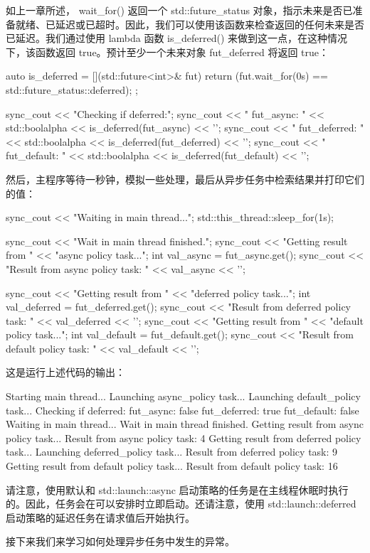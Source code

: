 如上一章所述， wait\_for() 返回一个 std::future\_status 对象，指示未来是否已准备就绪、已延迟或已超时。因此，我们可以使用该函数来检查返回的任何未来是否已延迟。我们通过使用 lambda 函数 is\_deferred() 来做到这一点，在这种情况下，该函数返回 true。预计至少一个未来对象 fut\_deferred 将返回 true：

\begin{cpp}
auto is_deferred = [](std::future<int>& fut) {
    return (fut.wait_for(0s) ==
    std::future_status::deferred);
};

sync_cout << "Checking if deferred:\n";
sync_cout << " fut_async: " << std::boolalpha
          << is_deferred(fut_async) << '\n';
sync_cout << " fut_deferred: " << std::boolalpha
          << is_deferred(fut_deferred) << '\n';
sync_cout << " fut_default: " << std::boolalpha
          << is_deferred(fut_default) << '\n';
\end{cpp}

然后，主程序等待一秒钟，模拟一些处理，最后从异步任务中检索结果并打印它们的值：

\begin{cpp}
sync_cout << "Waiting in main thread...\n";
std::this_thread::sleep_for(1s);

sync_cout << "Wait in main thread finished.\n";
sync_cout << "Getting result from "
          << "async policy task...\n";
int val_async = fut_async.get();
sync_cout << "Result from async policy task: "
          << val_async << '\n';

sync_cout << "Getting result from "
          << "deferred policy task...\n";
int val_deferred = fut_deferred.get();
sync_cout << "Result from deferred policy task: "
          << val_deferred << '\n';
sync_cout << "Getting result from "
          << "default policy task...\n";
int val_default = fut_default.get();
sync_cout << "Result from default policy task: "
          << val_default << '\n';
\end{cpp}

这是运行上述代码的输出：

\begin{shell}
Starting main thread...
Launching async_policy task...
Launching default_policy task...
Checking if deferred:
  fut_async: false
  fut_deferred: true
  fut_default: false
Waiting in main thread...
Wait in main thread finished.
Getting result from async policy task...
Result from async policy task: 4
Getting result from deferred policy task...
Launching deferred_policy task...
Result from deferred policy task: 9
Getting result from default policy task...
Result from default policy task: 16
\end{shell}

请注意，使用默认和 std::launch::async 启动策略的任务是在主线程休眠时执行的。因此，任务会在可以安排时立即启动。还请注意，使用 std::launch::deferred 启动策略的延迟任务在请求值后开始执行。

接下来我们来学习如何处理异步任务中发生的异常。
